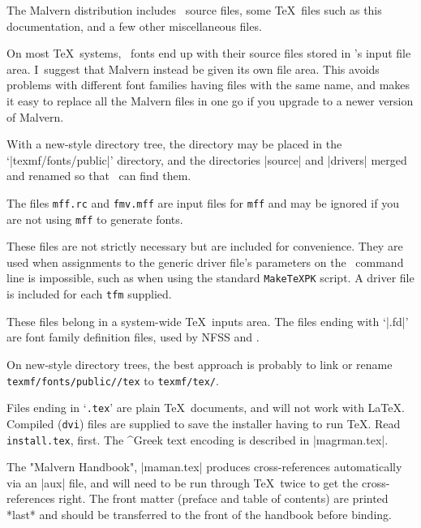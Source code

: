 	The Malvern distribution includes \MF\ source files, some \TeX\
	files such as this documentation, and a few other miscellaneous
	files.  

	On most \TeX\ systems, \MF\ fonts end up with their source files
	stored in \MF's input file area.  I~suggest that Malvern instead
	be given its own file area.  This avoids problems with different
	font families having files with the same name, and makes it easy
	to replace all the Malvern files in one go if you upgrade to a
	newer version of Malvern.

	With a new-style directory tree, the {\tt\ttpackage} directory may be placed in the
	`|texmf/fonts/public|' directory, and the directories |source|
	and |drivers| merged and renamed so that \MF\ can find them.

	The files {\tt mff.rc} and {\tt fmv.mff} are input files for
	{\tt mff} and may be ignored if you are not using {\tt mff} to
	generate fonts.

	These files are not strictly necessary but are included for
	convenience.  They are used when assignments to the generic
	driver file's parameters on the \MF\ command line is impossible,
	such as when using the standard {\tt MakeTeXPK} script.  A
	driver file is included for each {\tt tfm} supplied.

	These files belong in a system-wide \TeX\ inputs area.  The
	files ending with `|.fd|' are font family definition files,
	used by NFSS and \LaTeXe.

	On new-style directory trees, the best approach is probably to
	link or rename {\tt texmf/fonts/public/\ttpackage/tex} to
	{\tt texmf/tex/\ttpackage}.

	Files ending in `{\tt.tex}' are plain \TeX\ documents, and will
	not work with \LaTeX.  Compiled ({\tt dvi}) files are supplied
	to save the installer having to run \TeX.  Read {\tt
	install.tex}, first.  The ^{Greek} text encoding is described in
	|magrman.tex|.

	The "Malvern Handbook", |maman.tex| produces cross-references
	automatically via an |aux| file, and will need to be run through
	\TeX\ twice to get the cross-references right.  The front matter
	(preface and table of contents) are printed *last* and should be
	transferred to the front of the handbook before binding.

